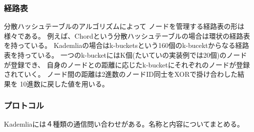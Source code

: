 \documentclass[sotsuron]{jcsie}
\begin{document}
\subsubsection{経路表}
分散ハッシュテーブルのアルゴリズムによって
ノードを管理する経路表の形は様々である。
例えば、Chordという分散ハッシュテーブルの場合は環状の経路表を持っている。
Kademliaの場合はk-bucketsという160個のk-bucektからなる経路表を持っている。
一つのk-bucketにはK個(たいていの実装例では20個)のノードが登録でき、
自身のノードとの距離に応じたk-bucketにそれぞれのノードが登録されていく。
ノード間の距離は2進数のノードID同士をXORで掛け合わした結果を
10進数に戻した値を用いる。
\subsubsection{プロトコル}
Kademliaには４種類の通信問い合わせがある。名称と内容についてまとめる。
\end{document}
